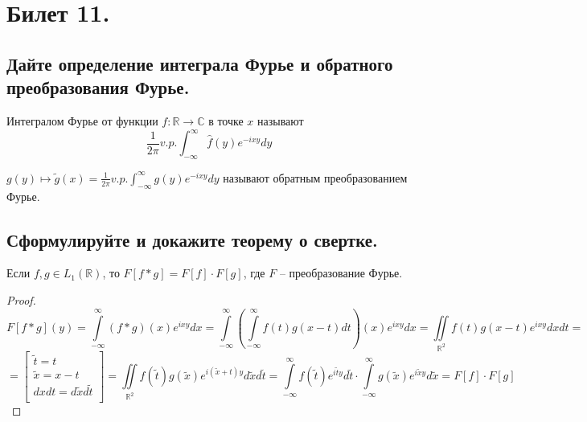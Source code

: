\section{Билет 11.}

\subsection{Дайте определение интеграла Фурье и обратного преобразования Фурье.}
\begin{definition}
    Интегралом Фурье от функции $f : \mathbb{R} \to \mathbb{C}$ в точке $x$ называют
    \[
        \frac{1}{2\pi} v. p. \int_{-\infty}^{\infty} \hat{f}(y) e^{-ixy} dy
    \]
\end{definition}
\begin{definition}
    $g(y) \mapsto \tilde{g}(x) = \frac{1}{2\pi} v. p. \int_{-\infty}^{\infty} g(y) e^{-ixy} dy$ называют обратным преобразованием Фурье.
\end{definition}

\subsection{Сформулируйте и докажите теорему о свертке.}
\begin{theorem}
    Если $f, g \in L_1(\mathbb{R})$, то $F[f * g] = F[f] \cdot F[g]$, где $F$ -- преобразование Фурье.
    \begin{proof}
        \[
            F[f * g](y) = \int \limits_{-\infty}^{\infty} (f * g)(x) e^{ixy} dx =
            \int \limits_{-\infty}^{\infty} \left(
                \int \limits_{-\infty}^{\infty} f(t)g(x-t) dt
            \right)(x) e^{ixy} dx =
            \iint \limits_{\mathbb{R}^2} f(t) g(x-t) e^{ixy} dx dt =
        \]
        \[
            = \left[
                \begin{matrix}
                    \tilde{t} =t \\
                    \tilde{x} = x - t \\
                    dx dt = d \tilde{x} d \tilde{t} \\
                \end{matrix}
            \right]
            =
            \iint \limits_{\mathbb{R}^2} f(\tilde{t}) g(\tilde{x}) e^{i(\tilde{x} + t)y} d \tilde{x} d \tilde{t} =
            \int \limits_{-\infty}^{\infty} f(\tilde{t}) e^{i\tilde{t}y} d \tilde{t}
            \cdot
            \int \limits_{-\infty}^{\infty} g(\tilde{x}) e^{i\tilde{x}y} d \tilde{x}
            =
            F[f] \cdot F[g]
        \]
    \end{proof}
\end{theorem}

